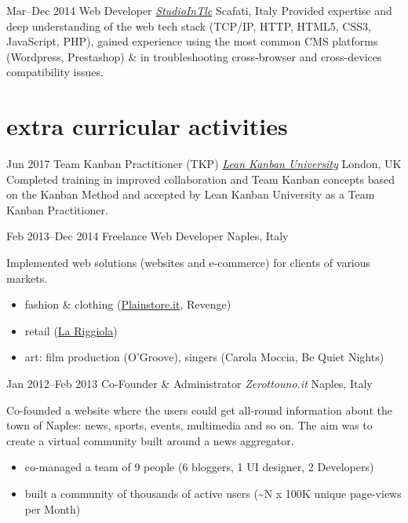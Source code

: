 \begin{entrylist}
\entry
{Mar--Dec 2014}
{Web Developer {\normalfont \emph{\href{http://www.studiointlc.com/}{StudioInTlc}}}}
{Scafati, Italy}
{Provided expertise and deep understanding of the web tech stack (TCP/IP, HTTP, HTML5, CSS3, JavaScript, PHP), gained  experience using the most common CMS platforms (Wordpress, Prestashop) \& in troubleshooting cross-browser and cross-devices compatibility issues.
}

\end{entrylist}

\section{\normalfont extra curricular activities}

\begin{entrylist}
\entry
{Jun 2017}
{Team Kanban Practitioner (TKP) {\normalfont \emph{\href{https://edu.leankanban.com/}{Lean Kanban University}}}}
{London, UK}
{Completed training in improved  collaboration  and  Team  Kanban concepts based on the Kanban Method and accepted by Lean Kanban University as a Team Kanban Practitioner.}

\entry
{Feb 2013--Dec 2014}
{Freelance Web Developer}
{Naples, Italy}
{Implemented web solutions (websites and e-commerce) for clients of various markets.
\vspace{-.2cm}
\begin{itemize}[leftmargin=.6cm]
	\item fashion \& clothing (\href{http://www.plainstore.it/}{Plainstore.it}, Revenge)
	\item retail (\href{http://www.la-riggiola.com/}{La Riggiola})
	\item art: film production (O'Groove), singers (Carola Moccia, Be Quiet Nights)
\end{itemize}
}

\entry
{Jan 2012--Feb 2013}
{Co-Founder \& Administrator {\normalfont \emph{Zerottouno.it}}}
{Naples, Italy}
{Co-founded a website where the users could get all-round information about the town of Naples: news, sports, events, multimedia and so on. The aim was to create a virtual community built around a news aggregator.  
\vspace{-.2cm}
\begin{itemize}[leftmargin=.6cm]
	\item co-managed a team of 9 people (6 bloggers, 1 UI designer, 2 Developers)
	\item built a community of thousands of active users (\textasciitilde N x 100K unique page-views per Month)	 
\end{itemize} 
}
\end{entrylist}